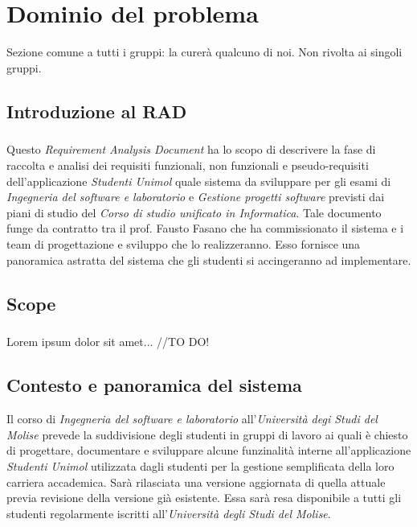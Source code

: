 
\chapter{Dominio del problema}
\label{ref:Introduzione}
Sezione comune a tutti i gruppi: la curerà qualcuno di noi. Non rivolta ai singoli gruppi.

\section{Introduzione al RAD}

\paragraph{}
Questo \textit{Requirement Analysis Document} ha lo scopo di descrivere la fase di raccolta e analisi dei requisiti funzionali, non funzionali e pseudo-requisiti dell'applicazione \textit{Studenti Unimol} quale sistema da sviluppare per gli esami di \textit{Ingegneria del software e laboratorio} e \textit{Gestione progetti software} previsti dai piani di studio del \textit{Corso di studio unificato in Informatica}. Tale documento funge da contratto tra il prof. Fausto Fasano che ha commissionato il sistema e i team di progettazione e sviluppo che lo realizzeranno. Esso fornisce una panoramica astratta del sistema che gli studenti si accingeranno ad implementare.

\section{Scope}

\paragraph{}
Lorem ipsum dolor sit amet... //TO DO!

\section{Contesto e panoramica del sistema}
Il corso di \textit{Ingegneria del software e laboratorio} all'\textit{Università degi Studi del Molise} prevede la suddivisione degli studenti in gruppi di lavoro ai quali è chiesto di progettare, documentare e sviluppare alcune funzinalità interne all'applicazione \textit{Studenti Unimol} utilizzata dagli studenti per la gestione semplificata della loro carriera accademica. Sarà rilasciata una versione aggiornata di quella attuale previa revisione della versione già esistente. Essa sarà resa disponibile a tutti gli studenti regolarmente iscritti all'\textit{Università degli Studi del Molise}.

